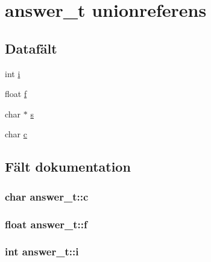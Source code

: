 \hypertarget{unionanswer__t}{}\section{answer\+\_\+t unionreferens}
\label{unionanswer__t}
\subsection*{Datafält}
\begin{DoxyCompactItemize}
\item 
int \hyperlink{unionanswer__t_a21d3d2b485a0dcf04e6ec6a60bb4d4db}{i}
\item 
float \hyperlink{unionanswer__t_acc96d348401060d8beea19445f9fe184}{f}
\item 
char $\ast$ \hyperlink{unionanswer__t_a0de66e8519f97035ac10688155603648}{s}
\item 
char \hyperlink{unionanswer__t_af43a34a48344362715fc22573522dbfa}{c}
\end{DoxyCompactItemize}


\subsection{Fält dokumentation}
\subsubsection[{\texorpdfstring{c}{c}}]{\setlength{\rightskip}{0pt plus 5cm}char answer\+\_\+t\+::c}\hypertarget{unionanswer__t_af43a34a48344362715fc22573522dbfa}{}\label{unionanswer__t_af43a34a48344362715fc22573522dbfa}
\subsubsection[{\texorpdfstring{f}{f}}]{\setlength{\rightskip}{0pt plus 5cm}float answer\+\_\+t\+::f}\hypertarget{unionanswer__t_acc96d348401060d8beea19445f9fe184}{}\label{unionanswer__t_acc96d348401060d8beea19445f9fe184}
\subsubsection[{\texorpdfstring{i}{i}}]{\setlength{\rightskip}{0pt plus 5cm}int answer\+\_\+t\+::i}\hypertarget{unionanswer__t_a21d3d2b485a0dcf04e6ec6a60bb4d4db}{}\label{unionanswer__t_a21d3d2b485a0dcf04e6ec6a60bb4d4db}
